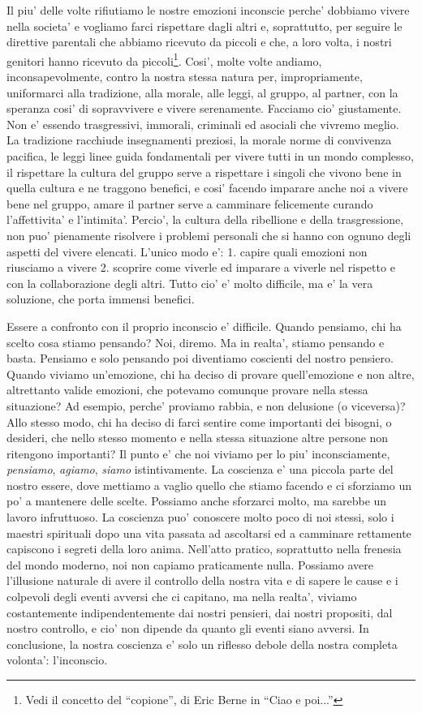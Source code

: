 Il piu' delle volte rifiutiamo le nostre emozioni inconscie perche' dobbiamo vivere nella societa' e vogliamo farci rispettare dagli altri e, soprattutto, per seguire le direttive parentali che abbiamo ricevuto da piccoli e che, a loro volta, i nostri genitori hanno ricevuto da piccoli\footnote{Vedi il concetto del ``copione'', di Eric Berne in ``Ciao e poi...''}. Cosi', molte volte andiamo, inconsapevolmente, contro la nostra stessa natura per, impropriamente, uniformarci alla tradizione, alla morale, alle leggi, al gruppo, al partner, con la speranza cosi' di sopravvivere e vivere serenamente. Facciamo cio' giustamente. Non e' essendo trasgressivi, immorali, criminali ed asociali che vivremo meglio. La tradizione racchiude insegnamenti preziosi, la morale norme di convivenza pacifica, le leggi linee guida fondamentali per vivere tutti in un mondo complesso, il rispettare la cultura del gruppo serve a rispettare i singoli che vivono bene in quella cultura e ne traggono benefici, e cosi' facendo imparare anche noi a vivere bene nel gruppo, amare il partner serve a camminare felicemente curando l'affettivita' e l'intimita'. Percio', la cultura della ribellione e della trasgressione, non puo' pienamente risolvere i problemi personali che si hanno con ognuno degli aspetti del vivere elencati. L'unico modo e': 1. capire quali emozioni non riusciamo a vivere 2. scoprire come viverle ed imparare a viverle nel rispetto e con la collaborazione degli altri. Tutto cio' e' molto difficile, ma e' la vera soluzione, che porta immensi benefici. 

Essere a confronto con il proprio inconscio e' difficile. 
Quando pensiamo, chi ha scelto cosa stiamo pensando? Noi, diremo. Ma in realta', stiamo pensando e basta. Pensiamo e solo pensando poi diventiamo coscienti del nostro pensiero.
Quando viviamo un'emozione, chi ha deciso di provare quell'emozione e non altre, altrettanto valide emozioni, che potevamo comunque provare nella stessa situazione? Ad esempio, perche' proviamo rabbia, e non delusione (o viceversa)?
Allo stesso modo, chi ha deciso di farci sentire come importanti dei bisogni, o desideri, che nello stesso momento e nella stessa situazione altre persone non ritengono importanti? Il punto e' che noi viviamo per lo piu' inconsciamente, \emph{pensiamo}, \emph{agiamo}, \emph{siamo} istintivamente. La coscienza e' una piccola parte del nostro essere, dove mettiamo a vaglio quello che stiamo facendo e ci sforziamo un po' a mantenere delle scelte. Possiamo anche sforzarci molto, ma sarebbe un lavoro infruttuoso. La coscienza puo' conoscere molto poco di noi stessi, solo i maestri spirituali dopo una vita passata ad ascoltarsi ed a camminare rettamente capiscono i segreti della loro anima. Nell'atto pratico, soprattutto nella frenesia del mondo moderno, noi non capiamo praticamente nulla. Possiamo avere l'illusione naturale di avere il controllo della nostra vita e di sapere le cause e i colpevoli degli eventi avversi che ci capitano, ma nella realta', viviamo costantemente indipendentemente dai nostri pensieri, dai nostri propositi, dal nostro controllo, e cio' non dipende da quanto gli eventi siano avversi. In conclusione, la nostra coscienza e' solo un riflesso debole della nostra completa volonta': l'inconscio.


